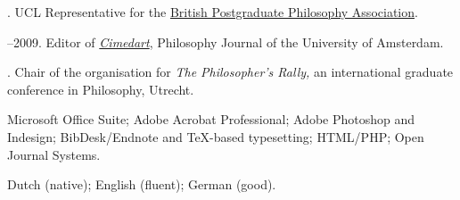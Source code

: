 \documentclass[11pt]{article}
\begin{document}
. UCL Representative for the \href{http://www.bppa-online.org}{British Postgraduate Philosophy Association}.

--2009. Editor of \href{http://www.cimedart.nl}{\emph{Cimedart}}, Philosophy Journal of the University of Amsterdam.

. Chair of the organisation for \emph{The Philosopher's Rally,} an international graduate conference in Philosophy, Utrecht.

\bigskip 

\medskip

\ind Microsoft Office Suite; Adobe Acrobat Professional; Adobe Photoshop and Indesign; BibDesk/Endnote and TeX-based typesetting; HTML/PHP; Open Journal Systems.

\bigskip 

\medskip

\ind Dutch (native); English (fluent); German (good).

\rfoot{\footnotesize{\today}}
\end{document}
